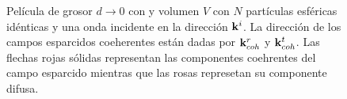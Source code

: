 \begin{figure}[h!]
	\caption{  Película de grosor $d\to 0$ con y volumen $V$ con $N$ partículas esféricas idénticas y una onda incidente en la dirección $\vb{k}^i$. La dirección de los campos esparcidos coeherentes están dadas por $\vb{k}^r_{coh}$ y $\vb{k}^t_{coh}$. Las flechas rojas sólidas representan las componentes coehrentes del campo esparcido mientras que las rosas represetan su componente difusa. }\label{fig:Eexc}
	\end{figure}	
	

